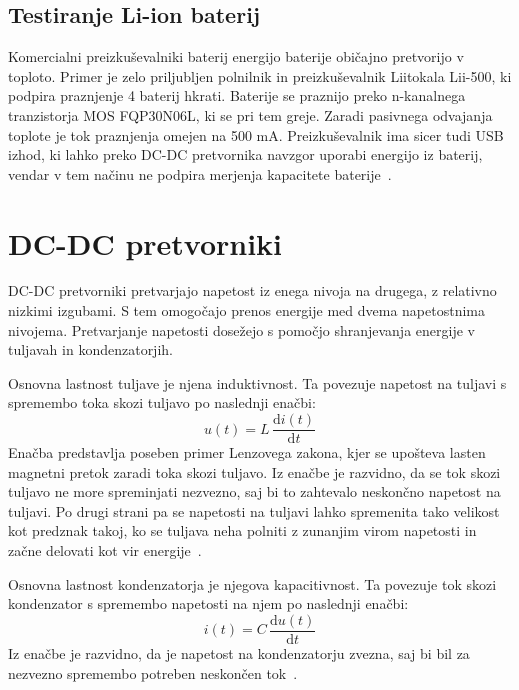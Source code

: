 \documentclass[a4paper,twoside,openright,12pt,slovene]{book}
\begin{document}
\section{Testiranje Li-ion baterij} \label{sec:testiranje_baterij}
Komercialni preizkuševalniki baterij energijo baterije običajno pretvorijo v toploto.
Primer je zelo priljubljen polnilnik in preizkuševalnik Liitokala Lii-500, ki podpira praznjenje 4 baterij hkrati.
Baterije se praznijo preko n-kanalnega tranzistorja MOS FQP30N06L, ki se pri tem greje.
Zaradi pasivnega odvajanja toplote je tok praznjenja omejen na 500 mA\@.
Preizkuševalnik ima sicer tudi USB izhod, ki lahko preko DC-DC pretvornika navzgor uporabi energijo iz baterij,
vendar v tem načinu ne podpira merjenja kapacitete baterije~\cite{shenzhen_xinshengli_power_supply_co_ltd_lii-500_nodate}.

\chapter{DC-DC pretvorniki} \label{ch:dc_dc_pretvorniki}

DC-DC pretvorniki pretvarjajo napetost iz enega nivoja na drugega, z relativno nizkimi izgubami.
S tem omogočajo prenos energije med dvema napetostnima nivojema.
Pretvarjanje napetosti dosežejo s pomočjo shranjevanja energije v tuljavah in kondenzatorjih.

Osnovna lastnost tuljave je njena induktivnost.
Ta povezuje napetost na tuljavi s spremembo toka skozi tuljavo po naslednji enačbi:
\begin{equation}
    u(t) = L\, \frac{\mathrm{d} i(t)}{\mathrm{d}t}
    \label{eq:enacba-tuljave}
\end{equation}
Enačba predstavlja poseben primer Lenzovega zakona, kjer se upošteva lasten magnetni pretok zaradi toka skozi tuljavo.
Iz enačbe je razvidno, da se tok skozi tuljavo ne more spreminjati nezvezno, saj bi to zahtevalo neskončno napetost na tuljavi.
Po drugi strani pa se napetosti na tuljavi lahko spremenita tako velikost kot predznak takoj,
ko se tuljava neha polniti z zunanjim virom napetosti in začne delovati kot vir energije~\cite{mack_chapter_2008}.

Osnovna lastnost kondenzatorja je njegova kapacitivnost.
Ta povezuje tok skozi kondenzator s spremembo napetosti na njem po naslednji enačbi:
\begin{equation}
    i(t) = C\, \frac{\mathrm{d} u(t)}{\mathrm{d}t}
    \label{eq:enacba-kondenzatorja}
\end{equation}
Iz enačbe je razvidno, da je napetost na kondenzatorju zvezna, saj bi bil za nezvezno spremembo potreben neskončen tok~\cite{mack_chapter_2008}.
\end{document}
